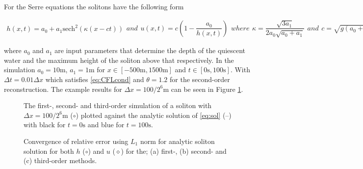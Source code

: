 \documentclass[SingleSpace,12pt,Proceedings]{Serre_ASCE}
\begin{document}
For the Serre equations the solitons have the following form
\begin{linenomath}
\begin{subequations}
\begin{gather}
h\left(x,t\right) = a_0 + a_1\text{sech}^2\left( \kappa\left(x - ct\right)\right)
\end{gather}
and
\begin{gather}
u\left(x,t\right) = c\left(1 - \dfrac{a_0}{h(x,t)} \right)
\end{gather}
where
\begin{gather}
\kappa = \dfrac{\sqrt{3a_1}}{2a_0 \sqrt{ a_0 + a_1}}
\end{gather}
and
\begin{gather}
c = \sqrt{g \left(a_0 + a_1\right)}
\end{gather}
\label{eq:sol}
\end{subequations}
\end{linenomath}
where $a_0$ and $a_1$ are input parameters that determine the depth of the quiescent water and the maximum height of the soliton above that respectively. In the simulation $a_0 = 10\text{m}$, $a_1 = 1\text{m}$ for $x\in\left[-500\text{m},1500\text{m}\right]$ and $t\in\left[0\text{s},100\text{s}\right]$. With $\Delta t = 0.01 \Delta x$ which satisfies \eqref{eq:CFLcond} and $\theta = 1.2$ for the second-order reconstruction. The example results for $\Delta x = 100 /2^{6}\text{m}$ can be seen in Figure \ref{fig:solitone}.

\subfiglabelskip=0pt
\begin{figure}
\centering
{}
\caption{The first-, second- and third-order simulation of a soliton with $\Delta x = 100 /2^{6}\text{m}$ ($\circ$) plotted against the analytic solution of \eqref{eq:sol} (\---) with black for $t =0\text{s}$ and blue for $t=100\text{s}$.}
\label{fig:solitone}
\end{figure}
\begin{figure}
\centering
{}
\caption{Convergence of relative error using $L_1$ norm for analytic soliton solution for both $h$ ($\circ$) and $u$ ($\diamond$) for the; (a) first-, (b) second- and (c) third-order methods.}
\label{fig:solitoncon}
\end{figure} 
\end{document}
